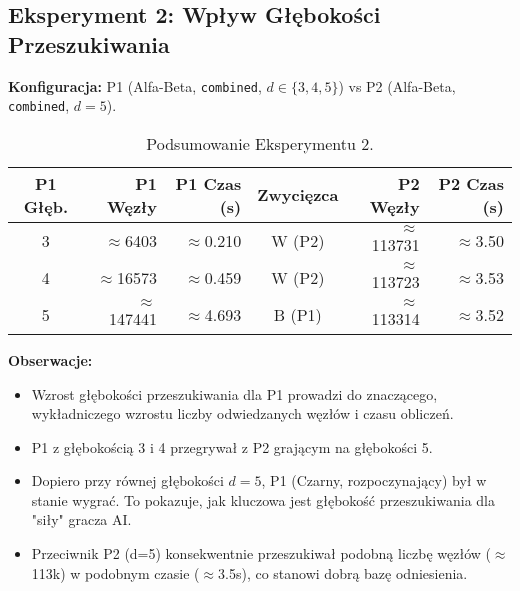 \documentclass[11pt,a4paper]{article}
\newcommand{\code}[1]{\texttt{#1}} %
\begin{document}
\subsection{Eksperyment 2: Wpływ Głębokości Przeszukiwania}
\textbf{Konfiguracja:} P1 (Alfa-Beta, \code{combined}, $d \in \{3,4,5\}$) vs P2 (Alfa-Beta, \code{combined}, $d=5$).
\begin{table}[H]
    \centering
    \caption{Podsumowanie Eksperymentu 2.}
    \begin{tabular}{crrcrr}
        \toprule
        P1 Głęb. & P1 Węzły & P1 Czas (s) & Zwycięzca & P2 Węzły & P2 Czas (s) \\
        \midrule
        3 & $\approx$6403  & $\approx$0.210 & W (P2) & $\approx$113731 & $\approx$3.50 \\
        4 & $\approx$16573 & $\approx$0.459 & W (P2) & $\approx$113723 & $\approx$3.53 \\
        5 & $\approx$147441& $\approx$4.693 & B (P1) & $\approx$113314 & $\approx$3.52 \\
        \bottomrule
    \end{tabular}
    \label{tab:e2_summary}
\end{table}
\textbf{Obserwacje:}
\begin{itemize}
    \item Wzrost głębokości przeszukiwania dla P1 prowadzi do znaczącego, wykładniczego wzrostu liczby odwiedzanych węzłów i czasu obliczeń.
    \item P1 z głębokością 3 i 4 przegrywał z P2 grającym na głębokości 5.
    \item Dopiero przy równej głębokości $d=5$, P1 (Czarny, rozpoczynający) był w stanie wygrać. To pokazuje, jak kluczowa jest głębokość przeszukiwania dla "siły" gracza AI.
    \item Przeciwnik P2 (d=5) konsekwentnie przeszukiwał podobną liczbę węzłów ($\approx$113k) w podobnym czasie ($\approx$3.5s), co stanowi dobrą bazę odniesienia.
\end{itemize}
\end{document}
